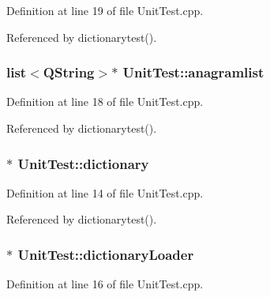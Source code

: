 Definition at line 19 of file Unit\-Test.\-cpp.



Referenced by dictionarytest().

\hypertarget{class_unit_test_aeb6e626c75d7caa5100aa605831a439f}{
\subsubsection[{anagramlist}]{\setlength{\rightskip}{0pt plus 5cm}list$<$Q\-String$>$$\ast$ Unit\-Test\-::anagramlist\hspace{0.3cm}{\ttfamily [private]}}}\label{class_unit_test_aeb6e626c75d7caa5100aa605831a439f}


Definition at line 18 of file Unit\-Test.\-cpp.



Referenced by dictionarytest().

\hypertarget{class_unit_test_a09902f0cb75bf2c03c56912ecd4682aa}{
\subsubsection[{dictionary}]{$\ast$ Unit\-Test\-::dictionary\hspace{0.3cm}{\ttfamily [private]}}}\label{class_unit_test_a09902f0cb75bf2c03c56912ecd4682aa}


Definition at line 14 of file Unit\-Test.\-cpp.



Referenced by dictionarytest().

\hypertarget{class_unit_test_a9cf46138e9006b18b978f6a3126c8c50}{
\subsubsection[{dictionary\-Loader}]{$\ast$ Unit\-Test\-::dictionary\-Loader\hspace{0.3cm}{\ttfamily [private]}}}\label{class_unit_test_a9cf46138e9006b18b978f6a3126c8c50}


Definition at line 16 of file Unit\-Test.\-cpp.



